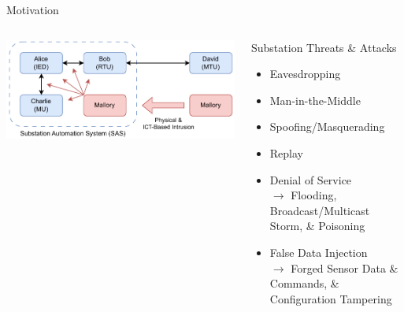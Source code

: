 \documentclass[en]{sdqbeamer}
\begin{document}
\appendix
\beginbackup
\begin{frame}{Motivation}
    \begin{columns}
        \centering
        \includegraphics[width=1.0\textwidth]{./figures/sas_intrusion.drawio.pdf}
        \begin{redblock}{Substation Threats \& Attacks}
            \begin{itemize}
                \item Eavesdropping
                \item Man-in-the-Middle
                \item Spoofing/Masquerading
                \item Replay
                \item Denial of Service\\$\rightarrow$ Flooding, Broadcast/Multicast Storm, \& Poisoning
                \item False Data Injection\\$\rightarrow$ Forged Sensor Data \& Commands, \& Configuration Tampering
            \end{itemize}
        \end{redblock}
    \end{columns}
\end{frame}
\end{document}
